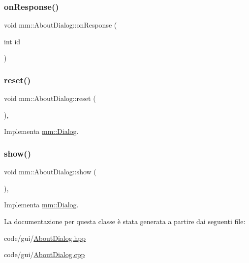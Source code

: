 \subsubsection{\texorpdfstring{on\+Response()}{onResponse()}}
{\footnotesize\ttfamily void mm\+::\+About\+Dialog\+::on\+Response (\begin{DoxyParamCaption}\item[{int}]{id }\end{DoxyParamCaption})}

\mbox{\label{classmm_1_1_about_dialog_a21f5b0a7c9d8e43baab78e073d7ade2b}} 
\subsubsection{\texorpdfstring{reset()}{reset()}}
{\footnotesize\ttfamily void mm\+::\+About\+Dialog\+::reset (\begin{DoxyParamCaption}{ }\end{DoxyParamCaption})\hspace{0.3cm}{\ttfamily [override]}, {\ttfamily [virtual]}}



Implementa \mbox{\hyperlink{classmm_1_1_dialog_abe6e5ac072c12c06971f60491f079d80}{mm\+::\+Dialog}}.

\mbox{\label{classmm_1_1_about_dialog_a9e06dc12f6950b74ccf6ccece693f108}} 
\subsubsection{\texorpdfstring{show()}{show()}}
{\footnotesize\ttfamily void mm\+::\+About\+Dialog\+::show (\begin{DoxyParamCaption}{ }\end{DoxyParamCaption})\hspace{0.3cm}{\ttfamily [override]}, {\ttfamily [virtual]}}



Implementa \mbox{\hyperlink{classmm_1_1_dialog_afda4b0dc7c0ac027c4b8fdb95713700f}{mm\+::\+Dialog}}.



La documentazione per questa classe è stata generata a partire dai seguenti file\+:\begin{DoxyCompactItemize}
\item 
code/gui/\mbox{\hyperlink{_about_dialog_8hpp}{About\+Dialog.\+hpp}}\item 
code/gui/\mbox{\hyperlink{_about_dialog_8cpp}{About\+Dialog.\+cpp}}\end{DoxyCompactItemize}
